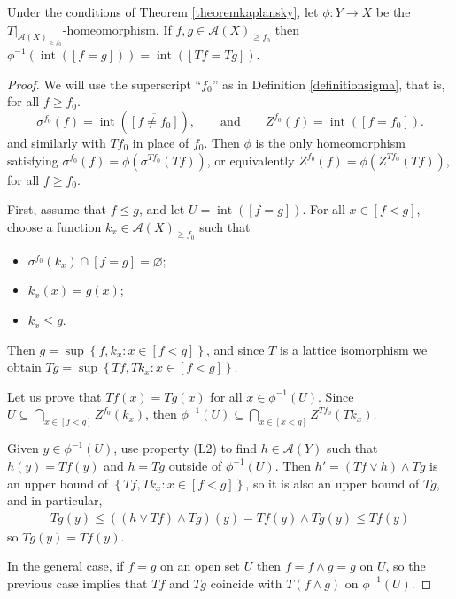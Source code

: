 \begin{lemma}\label{lemmarestrictionoflatticeisomorphismisbasic}
Under the conditions of Theorem \ref{theoremkaplansky}, let $\phi:Y\to X$ be the $T|_{\mathcal{A}(X)_{\geq f_0}}$-homeomorphism. If $f,g\in\mathcal{A}(X)_{\geq{f_0}}$ then $\phi^{-1}(\operatorname{int}([f=g]))=\operatorname{int}([Tf=Tg])$.
\end{lemma}
\begin{proof}
We will use the superscript ``$f_0$'' as in Definition \ref{definitionsigma}, that is, for all $f\geq f_0$.
\[\sigma^{f_0}(f)=\operatorname{int}(\overline{[f\neq f_0]}),\qquad\text{and}\qquad Z^{f_0}(f)=\operatorname{int}([f=f_0]).\]
and similarly with $Tf_0$ in place of $f_0$. Then $\phi$ is the only homeomorphism satisfying $\sigma^{f_0}(f)=\phi(\sigma^{Tf_0}(Tf))$, or equivalently $Z^{f_0}(f)=\phi(Z^{Tf_0}(Tf))$, for all $f\geq f_0$.

First, assume that $f\leq g$, and let $U=\operatorname{int}([f=g])$. For all $x\in[f<g]$, choose a function $k_x\in\mathcal{A}(X)_{\geq f_0}$ such that
\begin{itemize}
\item $\sigma^{f_0}(k_x)\cap [f=g]=\varnothing$;
\item $k_x(x)=g(x)$;
\item $k_x\leq g$.
\end{itemize}
Then $g=\sup\left\{f,k_x:x\in[f<g]\right\}$, and since $T$ is a lattice isomorphism we obtain $Tg=\sup\left\{Tf,Tk_x:x\in[f<g]\right\}$.

Let us prove that $Tf(x)=Tg(x)$ for all $x\in\phi^{-1}(U)$.
%
Since $U\subseteq\bigcap_{x\in[f<g]}Z^{f_0}(k_x)$, then $\phi^{-1}(U)\subseteq\bigcap_{x\in[x<g]}Z^{Tf_0}(Tk_x)$.

Given $y\in\phi^{-1}(U)$, use property (L2) to find $h\in\mathcal{A}(Y)$ such that $h(y)=Tf(y)$ and $h=Tg$ outside of $\phi^{-1}(U)$. Then $h'=(Tf\lor h)\land Tg$ is an upper bound of $\left\{Tf,Tk_x:x\in[f<g]\right\}$, so it is also an upper bound of $Tg$, and in particular,
\begin{align*}
Tg(y)\leq ((h\lor Tf)\land Tg)(y)=Tf(y)\land Tg(y)\leq Tf(y)
\end{align*}
so $Tg(y)=Tf(y)$.

In the general case, if $f=g$ on an open set $U$ then $f=f\land g=g$ on $U$, so the previous case implies that $Tf$ and $Tg$ coincide with $T(f\land g)$ on $\phi^{-1}(U)$.\qedhere
\end{proof}

